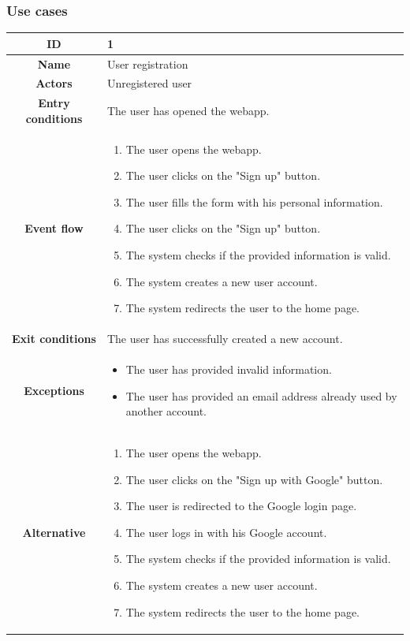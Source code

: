 \subsubsection{Use cases}
\begin{center}
    \begin{tabular}{ |c|m{10cm}| }
        \hline
        \textbf{ID} & 1 \\
        \hline
        \textbf{Name} & User registration \\
        \hline
        \textbf{Actors} & Unregistered user \\
        \hline
        \textbf{Entry conditions} & The user has opened the webapp. \\
        \hline
        \textbf{Event flow} &
        \begin{enumerate}
            \item The user opens the webapp.
            \item The user clicks on the "Sign up" button.
            \item The user fills the form with his personal information.
            \item The user clicks on the "Sign up" button.
            \item The system checks if the provided information is valid.
            \item The system creates a new user account.
            \item The system redirects the user to the home page.
        \end{enumerate} \\
        \hline
        \textbf{Exit conditions} & The user has successfully created a new account. \\
        \hline
        \textbf{Exceptions} & 
        \begin{itemize}
            \item The user has provided invalid information.
            \item The user has provided an email address already used by another account.
        \end{itemize} \\
        \hline
        \textbf{Alternative} &
        \begin{enumerate}
            \item The user opens the webapp.
            \item The user clicks on the "Sign up with Google" button.
            \item The user is redirected to the Google login page.
            \item The user logs in with his Google account.
            \item The system checks if the provided information is valid.
            \item The system creates a new user account.
            \item The system redirects the user to the home page.
        \end{enumerate} \\
        \hline
    \end{tabular}
\end{center}

